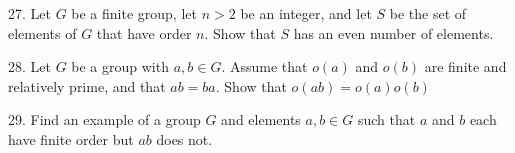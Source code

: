 \begin{mdframed}[style=darkAnswer,frametitle={Joe Starr}]

\end{mdframed}
\newpage
\begin{mdframed}[style=darkQuesion]
27. Let $G$ be a finite group, let $n>2$ be an integer, and let $S$ be the set of elements of
$G$ that have order $n .$ Show that $S$ has an even number of elements.

\end{mdframed}

\begin{mdframed}[style=darkAnswer,frametitle={Joe Starr}]

\end{mdframed}
\newpage
\begin{mdframed}[style=darkQuesion]
28. Let $G$ be a group with $a, b \in G$. Assume that $o(a)$ and $o(b)$ are finite and relatively prime, and that $a b=b a$. Show that $o(a b)=o(a) o(b)$

\end{mdframed}

\begin{mdframed}[style=darkAnswer,frametitle={Joe Starr}]

\end{mdframed}
\newpage
\begin{mdframed}[style=darkQuesion]
29. Find an example of a group $G$ and elements $a, b \in G$ such that $a$ and $b$ each have finite order but $a b$ does not.

\end{mdframed}

